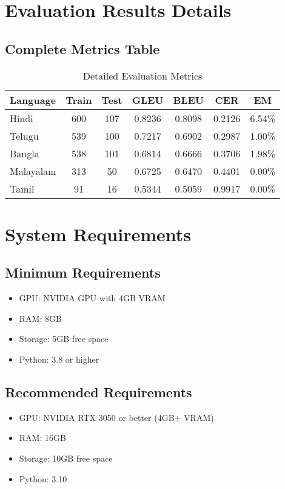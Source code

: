 \documentclass[12pt,a4paper]{article}
\begin{document}
\section{Evaluation Results Details}

\subsection{Complete Metrics Table}

\begin{table}[H]
\centering
\caption{Detailed Evaluation Metrics}
\small
\begin{tabular}{lcccccc}
\toprule
\textbf{Language} & \textbf{Train} & \textbf{Test} & \textbf{GLEU} & \textbf{BLEU} & \textbf{CER} & \textbf{EM} \\
\midrule
Hindi & 600 & 107 & 0.8236 & 0.8098 & 0.2126 & 6.54\% \\
Telugu & 539 & 100 & 0.7217 & 0.6902 & 0.2987 & 1.00\% \\
Bangla & 538 & 101 & 0.6814 & 0.6666 & 0.3706 & 1.98\% \\
Malayalam & 313 & 50 & 0.6725 & 0.6470 & 0.4401 & 0.00\% \\
Tamil & 91 & 16 & 0.5344 & 0.5059 & 0.9917 & 0.00\% \\
\bottomrule
\end{tabular}
\end{table}

\section{System Requirements}

\subsection{Minimum Requirements}
\begin{itemize}
    \item GPU: NVIDIA GPU with 4GB VRAM
    \item RAM: 8GB
    \item Storage: 5GB free space
    \item Python: 3.8 or higher
\end{itemize}

\subsection{Recommended Requirements}
\begin{itemize}
    \item GPU: NVIDIA RTX 3050 or better (4GB+ VRAM)
    \item RAM: 16GB
    \item Storage: 10GB free space
    \item Python: 3.10
\end{itemize}
\end{document}
